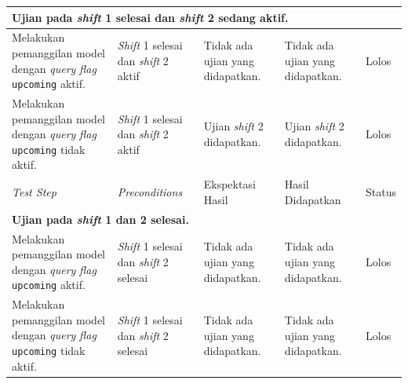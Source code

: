 \begin{enumerate}
\begin{longtable}{|p{}|p{}|p{}|p{}|p{}|}
            \multicolumn{5}{|p{0.8\textwidth}|}{\textbf{Ujian pada \textit{shift} 1 selesai dan \textit{shift} 2 sedang aktif.}}\\
            \hline
            Melakukan pemanggilan model dengan \textit{query} \textit{flag} \texttt{upcoming} aktif. &
            \textit{Shift} 1 selesai dan \textit{shift} 2 aktif & Tidak ada ujian yang didapatkan. & Tidak ada ujian yang didapatkan. & Lolos \\
            \hline
            Melakukan pemanggilan model dengan \textit{query} \textit{flag} \texttt{upcoming} tidak aktif. &
            \textit{Shift} 1 selesai dan \textit{shift} 2 aktif & Ujian \textit{shift} 2 didapatkan. & Ujian \textit{shift} 2 didapatkan. & Lolos \\
            \hline
            \textit{Test Step} & \textit{Preconditions} & Ekspektasi Hasil & Hasil Didapatkan & Status  \\
            \hline
            \multicolumn{5}{|p{0.8\textwidth}|}{\textbf{Ujian pada \textit{shift} 1 dan 2 selesai.}}\\
            \hline
            Melakukan pemanggilan model dengan \textit{query} \textit{flag} \texttt{upcoming} aktif. &
            \textit{Shift} 1 selesai dan \textit{shift} 2 selesai & Tidak ada ujian yang didapatkan. & Tidak ada ujian yang didapatkan. & Lolos \\
            \hline
            Melakukan pemanggilan model dengan \textit{query} \textit{flag} \texttt{upcoming} tidak aktif. &
            \textit{Shift} 1 selesai dan \textit{shift} 2 selesai & Tidak ada ujian yang didapatkan. & Tidak ada ujian yang didapatkan. & Lolos \\
            \hline
        \end{longtable}
        
\end{enumerate}


